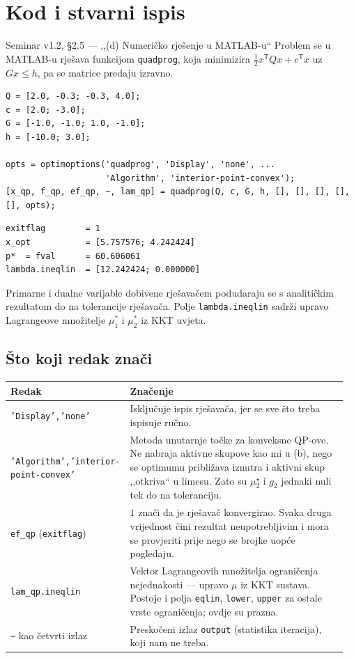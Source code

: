 \section{Kod i stvarni ispis}
\label{sec:z1d-kod}

\begin{seminar}{Seminar v1.2, §2.5 --- ,,(d) Numeričko rješenje u MATLAB-u``}
Problem se u MATLAB-u rješava funkcijom \texttt{quadprog}, koja minimizira
$\tfrac{1}{2}x^{\mathsf{T}}Qx + c^{\mathsf{T}}x$ uz $Gx \leq h$, pa se matrice
predaju izravno.

\begin{lstlisting}[style=matlabstyle]
Q = [2.0, -0.3; -0.3, 4.0];
c = [2.0; -3.0];
G = [-1.0, -1.0; 1.0, -1.0];
h = [-10.0; 3.0];

opts = optimoptions('quadprog', 'Display', 'none', ...
                    'Algorithm', 'interior-point-convex');
[x_qp, f_qp, ef_qp, ~, lam_qp] = quadprog(Q, c, G, h, [], [], [], [], [], opts);
\end{lstlisting}

\begin{lstlisting}[style=outputstyle]
exitflag        = 1
x_opt           = [5.757576; 4.242424]
p*  = fval      = 60.606061
lambda.ineqlin  = [12.242424; 0.000000]
\end{lstlisting}

Primarne i dualne varijable dobivene rješavačem podudaraju se s analitičkim
rezultatom do na tolerancije rješavača. Polje \texttt{lambda.ineqlin} sadrži
upravo Lagrangeove množitelje $\mu_1^*$ i $\mu_2^*$ iz KKT uvjeta.
\end{seminar}

\subsection{Što koji redak znači}

\begin{longtable}{@{}p{0.30\linewidth} p{0.66\linewidth}@{}}
\toprule
\textbf{Redak} & \textbf{Značenje} \\
\midrule
\endhead
\texttt{'Display','none'} & Isključuje ispis rješavača, jer se sve što treba
ispisuje ručno. \\[5pt]
\texttt{'Algorithm','interior-\allowbreak point-convex'} & Metoda unutarnje točke
za konveksne QP-ove. Ne nabraja aktivne skupove kao mi u (b), nego se optimumu
približava iznutra i aktivni skup ,,otkriva`` u limesu. Zato su
$\mu_2^{\star}$ i $g_2$ jednaki nuli tek do na toleranciju. \\[5pt]
\texttt{ef\_qp} (\texttt{exitflag}) & $1$ znači da je rješavač konvergirao.
Svaka druga vrijednost čini rezultat neupotrebljivim i mora se provjeriti prije
nego se brojke uopće pogledaju. \\[5pt]
\texttt{lam\_qp.ineqlin} & Vektor Lagrangeovih množitelja ograničenja
nejednakosti --- upravo $\mu$ iz KKT sustava. Postoje i polja
\texttt{eqlin}, \texttt{lower}, \texttt{upper} za ostale vrste ograničenja; ovdje
su prazna. \\[5pt]
\texttt{\textasciitilde} kao četvrti izlaz & Preskočeni izlaz
\texttt{output} (statistika iteracija), koji nam ne treba. \\
\bottomrule
\end{longtable}

